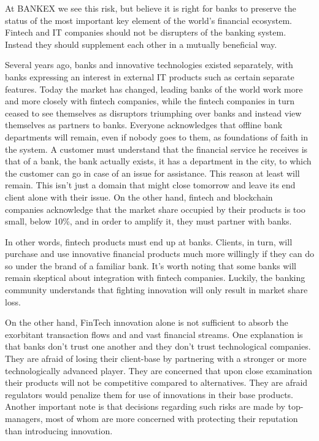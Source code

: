 \documentclass{article}
\begin{document}
\begin{multicols}{2}
At BANKEX we see this risk, but believe it is right for banks to preserve the status of the most important key element of the world’s financial ecosystem. Fintech and IT companies should not be disrupters of the banking system. Instead they should supplement each other in a mutually beneficial way.

Several years ago, banks and innovative technologies existed separately, with banks expressing an interest in external IT products such as certain separate features. Today the market has changed, leading banks of the world work more and more closely with fintech companies, while the fintech companies in turn ceased to see themselves as disruptors triumphing over banks and instead view themselves as partners to banks. Everyone acknowledges that offline bank departments will remain, even if nobody goes to them, as foundations of faith in the system. A customer must understand that the financial service he receives is that of a bank, the bank actually exists, it has a department in the city, to which the customer can go in case of an issue for assistance. This reason at least will remain. This isn’t just a domain that might close tomorrow and leave its end client alone with their issue. On the other hand, fintech and blockchain companies acknowledge that the market share occupied by their products is too small, below 10\%, and in order to amplify it, they must partner with banks.

In other words, fintech products must end up at banks. Clients, in turn, will purchase and use innovative financial products much more willingly if they can do so under the brand of a familiar bank. It’s worth noting that some banks will remain skeptical about integration with fintech companies. Luckily, the banking community understands that fighting innovation will only result in market share loss.

On the other hand, FinTech innovation alone is not sufficient to absorb the exorbitant transaction flows and and vast financial streams. One explanation is that banks don’t trust one another and they don’t trust technological companies. They are afraid of losing their client-base by partnering with a stronger or more technologically advanced player. They are concerned that upon close examination their products will not be competitive compared to alternatives. They are afraid regulators would penalize them for use of innovations in their base products. Another important note is that decisions regarding such risks are made by top-managers, most of whom are more concerned with protecting their reputation than introducing innovation.


\end{multicols}
\end{document}
